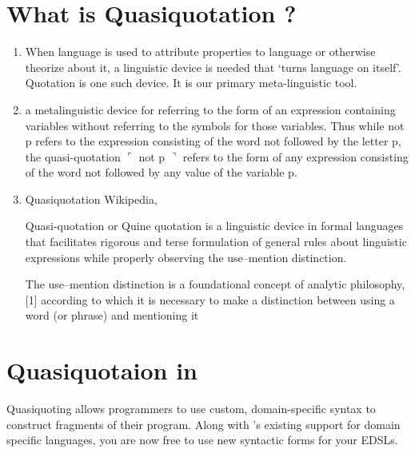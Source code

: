\documentclass[thesis-solanki.tex]{subfiles}
\begin{document}
\section{What is Quasiquotation ?}
\begin{enumerate}
\item \cite{website:quotationstanford}

When language is used to attribute properties to language or otherwise theorize about it, a linguistic device is needed that ‘turns 
language on itself’. Quotation is one such device. It is our primary meta-linguistic tool.

\item \cite{website:quasiquotationfreedictionary}

a metalinguistic device for referring to the form of an expression containing variables without referring to the symbols for those 
variables. Thus while not p refers to the expression consisting of the word not followed by the letter p, the quasi-quotation \newline
$\ulcorner$ not p $\urcorner$ refers to the form of any expression consisting of the word not followed by any value of the variable p.

\item  Quasiquotation Wikipedia, \cite{wikiquasi}

Quasi-quotation or Quine quotation is a linguistic device in formal languages that facilitates rigorous and terse formulation of general rules about linguistic expressions while properly observing the use–mention distinction.

\cite{website:usementiondistinctionwiki}
The use–mention distinction is a foundational concept of analytic philosophy,[1] according to which it is necessary to make a distinction 
between using a word (or phrase) and mentioning it


\end{enumerate}

\section{Quasiquotaion in }
\cite{haskellquasi, mainland2007s} 

Quasiquoting allows programmers to use custom, domain-specific syntax to construct fragments of their program. Along with 
's existing support for domain specific languages, you are now free to use new syntactic forms for your EDSLs. 
\end{document}
